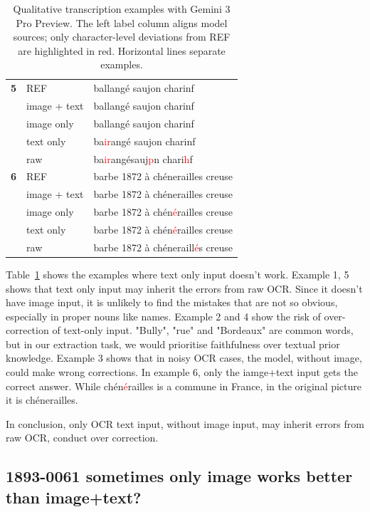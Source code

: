 \begin{table}[htbp]
\begin{minipage}[t]{0.48\linewidth}
\begin{tabularx}{\linewidth}{>{\bfseries}ll X}
\hline
5&REF & ballangé saujon charinf \\
&image + text & ballangé saujon charinf \\
&image only & ballangé saujon charinf \\
&text only & ba\textcolor{red}{ir}angé saujon charinf \\
&raw & ba\textcolor{red}{ir}angésauj\textcolor{red}{p}n chari\textcolor{red}{h}f \\
\hline
6&REF & barbe 1872 à chénerailles creuse \\
&image + text & barbe 1872 à chénerailles creuse \\
&image only & barbe 1872 à chén\textcolor{red}{é}railles creuse \\
&text only & barbe 1872 à chén\textcolor{red}{é}railles creuse \\
&raw & barbe 1872 à chéneraill\textcolor{red}{é}s creuse \\
\hline
\end{tabularx}
\end{minipage}

\caption{Qualitative transcription examples with Gemini 3 Pro Preview. The left label column aligns model sources; only character-level deviations from REF are highlighted in red. Horizontal lines separate examples.}
\label{tab:two_column_aligned_examples}
\end{table}


Table~\ref{tab:two_column_aligned_examples} shows the examples where text only input doesn't work. Example 1, 5 shows that text only input may inherit the errors from raw OCR. Since it doesn't have image input, it is unlikely to find the mistakes that are not so obvious, especially in proper nouns like names. Example 2 and 4 show the risk of over-correction of text-only input. "Bully", "rue" and "Bordeaux" are common words, but in our extraction task, we would prioritise faithfulness over textual prior knowledge. Example 3 shows that in noisy OCR cases, the model, without image, could make wrong corrections. In example 6, only the iamge+text input gets the correct answer. While chén\textcolor{red}{é}railles is a commune in France, in the original picture it is chénerailles.

In conclusion, only OCR text input, without image input, may inherit errors from raw OCR, conduct over correction.

\subsection{1893-0061 sometimes only image works better than image+text?}

